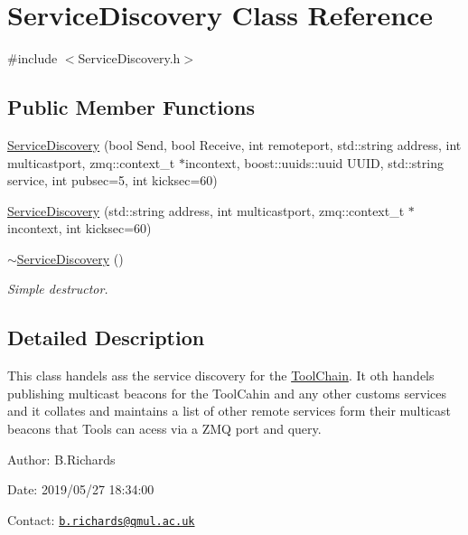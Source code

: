 \hypertarget{classServiceDiscovery}{\section{Service\-Discovery Class Reference}
\label{classServiceDiscovery}
}


{\ttfamily \#include $<$Service\-Discovery.\-h$>$}

\subsection*{Public Member Functions}
\begin{DoxyCompactItemize}
\item 
\hyperlink{classServiceDiscovery_ab69c2cacaf5a388fac88e57f3361b576}{Service\-Discovery} (bool Send, bool Receive, int remoteport, std\-::string address, int multicastport, zmq\-::context\-\_\-t $\ast$incontext, boost\-::uuids\-::uuid U\-U\-I\-D, std\-::string service, int pubsec=5, int kicksec=60)
\item 
\hyperlink{classServiceDiscovery_a3dbd15f19345b0c9746731308e26b034}{Service\-Discovery} (std\-::string address, int multicastport, zmq\-::context\-\_\-t $\ast$incontext, int kicksec=60)
\item 
\hypertarget{classServiceDiscovery_aee64ecb3b4c07b7f2a070a66ecb7dc70}{\hyperlink{classServiceDiscovery_aee64ecb3b4c07b7f2a070a66ecb7dc70}{$\sim$\-Service\-Discovery} ()}\label{classServiceDiscovery_aee64ecb3b4c07b7f2a070a66ecb7dc70}

\begin{DoxyCompactList}\small\item\em Simple destructor. \end{DoxyCompactList}\end{DoxyCompactItemize}


\subsection{Detailed Description}
This class handels ass the service discovery for the \hyperlink{classToolChain}{Tool\-Chain}. It oth handels publishing multicast beacons for the Tool\-Cahin and any other customs services and it collates and maintains a list of other remote services form their multicast beacons that Tools can acess via a Z\-M\-Q port and query.

\begin{DoxyParagraph}{Author\-:}
B.\-Richards 
\end{DoxyParagraph}
\begin{DoxyParagraph}{Date\-:}
2019/05/27 18\-:34\-:00 
\end{DoxyParagraph}
Contact\-: \href{mailto:b.richards@qmul.ac.uk}{\tt b.\-richards@qmul.\-ac.\-uk} 

